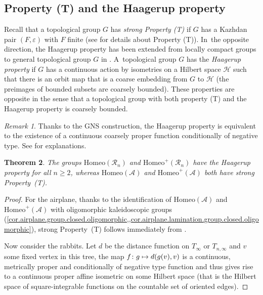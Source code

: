 \documentclass[JEP,XML,SOM,Unicode,NoFloatCountersInSection,published]{cedram}
\newcommand\mto{\mathchoice{\longmapsto}{\mapsto}{\mapsto}{\mapsto}}
\theoremstyle{plain}
\newtheorem{theorem}{Theorem}[section]
\theoremstyle{definition}
\theoremstyle{remark}
\newtheorem{remark}[theorem]{Remark}
\newcommand{\Homeo}{\mathrm{Homeo}}
\newcommand{\A}{\mathcal{A}}
\newcommand{\R}{\mathcal{R}}
\begin{document}
\subsection{Property (T) and the Haagerup property}\label{sec.haagerup.property.(T)}

Recall that a topological group $G$ has \emph{strong Property (T)} if $G$ has a Kazhdan pair $(F,\varepsilon)$ with $F$ finite (see \cite{MR2415834} for details about Property (T)). In~the opposite direction, the Haagerup property has been extended from locally compact groups to general topological group $G$ in \cite{MR3707816}. A~topological group $G$ has the \emph{Haagerup property} if $G$ has a continuous action by isometries on a Hilbert space $\mathcal{H}$ such that there is an orbit map that is a coarse embedding from $G$ to $\mathcal{H}$ (\ie the preimages of bounded subsets are coarsely bounded).
These properties are opposite in the sense that a topological group with both property (T) and the Haagerup property is coarsely bounded.

\begin{remark}
Thanks to the GNS construction, the Haagerup property is equivalent to the existence of a continuous coarsely proper function conditionally of negative type.
See \cite[\S 2.10]{MR2415834} for explanations.
\end{remark}

\begin{theorem}
\label{thm.property.T}
The groups $\Homeo(\R_n)$ and $\Homeo^+(\R_n)$ have the Haagerup property for all $n \geq 2$, whereas $\Homeo(\A)$ and $\Homeo^+(\A)$ both have strong Property~(T).
\end{theorem}

\begin{proof}
For the airplane, thanks to the identification of $\Homeo(\A)$ and $\Homeo^+(\A)$ with oligomorphic kaleidoscopic groups (\cref{cor.airplane.group.closed.oligomorphic,,cor.airplane.lamination.group.closed.oligomorphic}), strong Property~(T) follows immediately from \cite[Th.\,1.1]{MR3417738}.

Now consider the rabbits.
Let $d$ be the distance function on $T_\infty$ or $T_{n,\infty}$ and $v$ some fixed vertex in this tree, the map $f\colon g\mto d(g(v),v)$ is a continuous, metrically proper and conditionally of negative type function \cite[C.2.2(iii)]{MR2415834} and thus gives rise to a continuous proper affine isometric on some Hilbert space (that is the Hilbert space of square-integrable functions on the countable set of oriented edges).
\end{proof}
\end{document}
